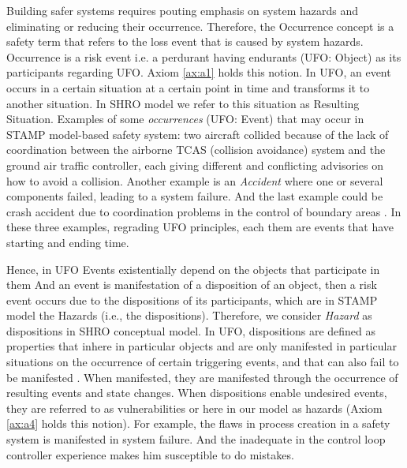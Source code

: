 \documentclass[sw]{iosart2x}
\newcommand{\COMMENT}[1]{\hl{ \textnormal{#1}}}
\newcommand{\COMMENT}[2]{\hl{ \textnormal{#1} \textbf{comment:} \textit{#2}}\xspace}
\newcommand{\term}[1]{\textnormal{\textsf{#1}}}
\begin{document}
Building safer systems requires pouting emphasis on system hazards and eliminating or reducing their occurrence. Therefore, the \term{Occurrence} concept is a safety term that refers to the loss event that is caused by system hazards. \term{Occurrence} is a risk event i.e. a perdurant having endurants (UFO: Object) as its participants regarding UFO. Axiom \ref{ax:a1} holds this notion. In UFO, an event occurs in a certain situation at a certain point in time and transforms it to another situation. In SHRO model we refer to this situation as \term{Resulting Situation}. Examples of some \emph{occurrences} (UFO: Event) that may occur in STAMP model-based safety system: two aircraft collided because of the lack of coordination between the airborne TCAS (collision avoidance) system and the ground air traffic controller, each giving different and conflicting advisories on how to avoid a collision. Another example is an \emph{Accident} where one or several components failed, leading to a system failure. And the last example could be crash accident due to coordination problems in the control of boundary areas \cite{leveson2012engineering}. In these three examples, regrading UFO principles, each them are events that have starting and ending time.

Hence, in UFO Events existentially depend on the objects that participate in them And an event is manifestation of a disposition of an object, then a risk event occurs due to the dispositions of its participants, which are in STAMP model the \term{Hazards} (i.e., the dispositions). Therefore, we consider \emph{Hazard} as dispositions in SHRO conceptual model. In UFO, dispositions are defined as properties that inhere in particular objects and are only manifested in particular situations on the occurrence of certain triggering events, and that can also fail to be manifested \cite{Guizzardi2014}. When manifested, they are manifested through the occurrence of resulting events and state changes. When dispositions enable undesired events, they are referred to as vulnerabilities or here in our model as hazards (Axiom \ref{ax:a4} holds this notion). For example, the flaws in process creation in a safety system is manifested in system failure. And the inadequate in the control loop controller experience makes him susceptible to do mistakes. 
\end{document}
